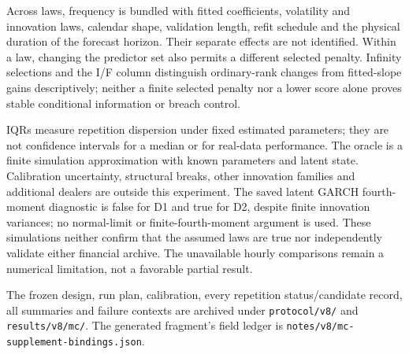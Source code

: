 Across laws, frequency is bundled with fitted coefficients, volatility and innovation laws, calendar shape, validation length, refit schedule and the physical duration of the forecast horizon. Their separate effects are not identified. Within a law, changing the predictor set also permits a different selected penalty. Infinity selections and the I/F column distinguish ordinary-rank changes from fitted-slope gains descriptively; neither a finite selected penalty nor a lower score alone proves stable conditional information or breach control.

IQRs measure repetition dispersion under fixed estimated parameters; they are not confidence intervals for a median or for real-data performance. The oracle is a finite simulation approximation with known parameters and latent state. Calibration uncertainty, structural breaks, other innovation families and additional dealers are outside this experiment. The saved latent GARCH fourth-moment diagnostic is false for D1 and true for D2, despite finite innovation variances; no normal-limit or finite-fourth-moment argument is used. These simulations neither confirm that the assumed laws are true nor independently validate either financial archive. The unavailable hourly comparisons remain a numerical limitation, not a favorable partial result.

The frozen design, run plan, calibration, every repetition status/candidate record, all summaries and failure contexts are archived under \texttt{protocol/v8/} and \texttt{results/v8/mc/}. The generated fragment's field ledger is \texttt{notes/v8/mc-supplement-bindings.json}.
